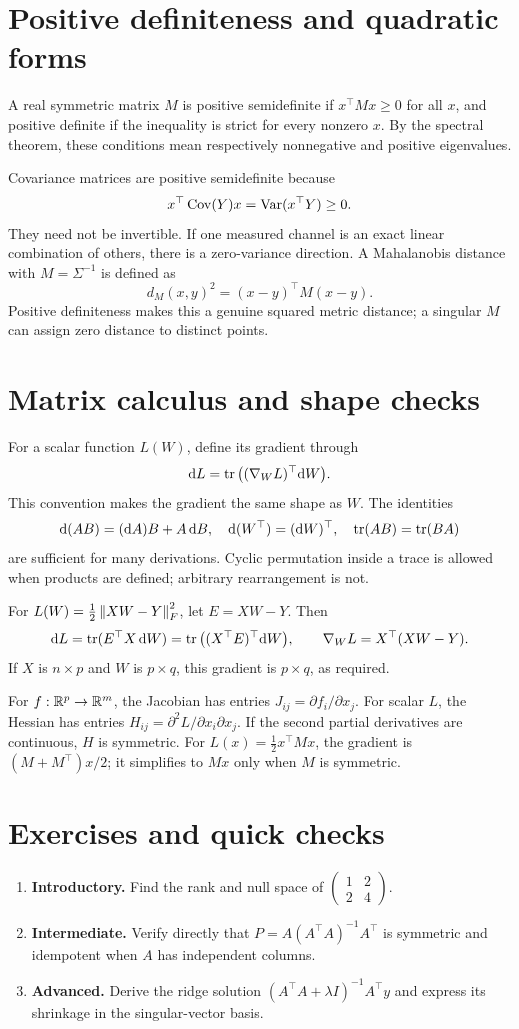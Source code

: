 \section{Positive definiteness and quadratic forms}
A real symmetric matrix \(M\) is positive semidefinite if \(x^\top Mx\geq0\) for all \(x\), and positive definite if the inequality is strict for every nonzero \(x\). By the spectral theorem, these conditions mean respectively nonnegative and positive eigenvalues.

Covariance matrices are positive semidefinite because
\[
x^\top\operatorname{Cov}(Y)x=\operatorname{Var}(x^\top Y)\geq0.
\]
They need not be invertible. If one measured channel is an exact linear combination of others, there is a zero-variance direction. A Mahalanobis distance with \(M=\Sigma^{-1}\) is defined as
\[
d_M(x,y)^2=(x-y)^\top M(x-y).
\]
Positive definiteness makes this a genuine squared metric distance; a singular \(M\) can assign zero distance to distinct points.

\section{Matrix calculus and shape checks}
For a scalar function \(L(W)\), define its gradient through
\[
\mathrm{d} L=\operatorname{tr}\big((\nabla_WL)^\top\mathrm{d} W\big).
\]
This convention makes the gradient the same shape as \(W\). The identities
\[
\mathrm{d}(AB)=(\mathrm{d} A)B+A\,\mathrm{d} B,\quad
\mathrm{d}(W^\top)=(\mathrm{d} W)^\top,\quad
\operatorname{tr}(AB)=\operatorname{tr}(BA)
\]
are sufficient for many derivations. Cyclic permutation inside a trace is allowed when products are defined; arbitrary rearrangement is not.

For \(L(W)=\frac12\left\lVert XW-Y\right\rVert_F^2\), let \(E=XW-Y\). Then
\[
\mathrm{d} L=\operatorname{tr}(E^\top X\,\mathrm{d} W)
=\operatorname{tr}\big((X^\top E)^\top\mathrm{d} W\big),
\qquad \nabla_WL=X^\top(XW-Y).
\]
If \(X\) is \(n\times p\) and \(W\) is \(p\times q\), this gradient is \(p\times q\), as required.

For \(f:\mathbb{R}^p\to\mathbb{R}^m\), the Jacobian has entries \(J_{ij}=\partial f_i/\partial x_j\). For scalar \(L\), the Hessian has entries \(H_{ij}=\partial^2L/\partial x_i\partial x_j\). If the second partial derivatives are continuous, \(H\) is symmetric. For \(L(x)=\frac12x^\top Mx\), the gradient is \((M+M^\top)x/2\); it simplifies to \(Mx\) only when \(M\) is symmetric.

\section*{Exercises and quick checks}
\begin{enumerate}
\item \textbf{Introductory.} Find the rank and null space of \(\begin{pmatrix}1&2\\2&4\end{pmatrix}\).
\item \textbf{Intermediate.} Verify directly that \(P=A(A^\top A)^{-1}A^\top\) is symmetric and idempotent when \(A\) has independent columns.
\item \textbf{Advanced.} Derive the ridge solution \((A^\top A+\lambda I)^{-1}A^\top y\) and express its shrinkage in the singular-vector basis.
\end{enumerate}

